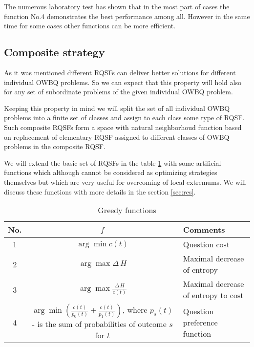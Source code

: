 \documentclass[11pt]{article}
\begin{document}
The numerous laboratory test has shown that in the most part of cases the function No.4 demonstrates the best performance among all. However in the same time for some cases other functions can be more efficient.

%
%
%
\subsection{Composite strategy}
As it was mentioned different RQSFs can deliver better solutions for different individual OWBQ problems. So we can expect that this property will hold also for any set of subordinate problems of the given individual OWBQ problem.

Keeping this property in mind we will split the set of all individual OWBQ problems into a finite set of classes and assign to each class some type of RQSF. Such composite RQSFs form a space with natural neighborhoud function based on replacement of elementary RQSF assigned to different classes of OWBQ problems in the composite RQSF.

We will extend the basic set of RQSFs in the table \ref{tab:4} with some artificial functions which although cannot be considered as optimizing strategies themselves but which are very useful for overcoming of local extremums. We will discuss these functions with more details in the section \ref{sec:res}.

\renewcommand\arraystretch{2.3}
\begin{table}[ht]
\begin{center}
\begin{tabular}{|c||c|l|} \hline
\textsf{No.} & $f$ & \textsf{Comments} \\ \hline\hline
1 & $\arg \min c(t)$ & Question cost \\ \hline
2 & $\arg \max \Delta\,H$ & \multicolumn{1}{m{60mm}|}{Maximal decrease of entropy} \\ \hline
3 & $\arg \max \frac{\Delta\,H}{c(t)}$ & Maximal decrease of entropy to cost \\ \hline
4 & \multicolumn{1}{m{65mm}|}{$\arg \min (\frac{c(t)}{p_0(t)}+\frac{c(t)}{p_1(t)})$, where $p_s(t)$ - is the sum of probabilities of outcome $s$ for $t$} & Question preference function \\  \hline
\end{tabular}
\end{center}
\caption{Greedy functions\label{tab:4}}
\end{table}
\renewcommand\arraystretch{1}
    
\end{document}
